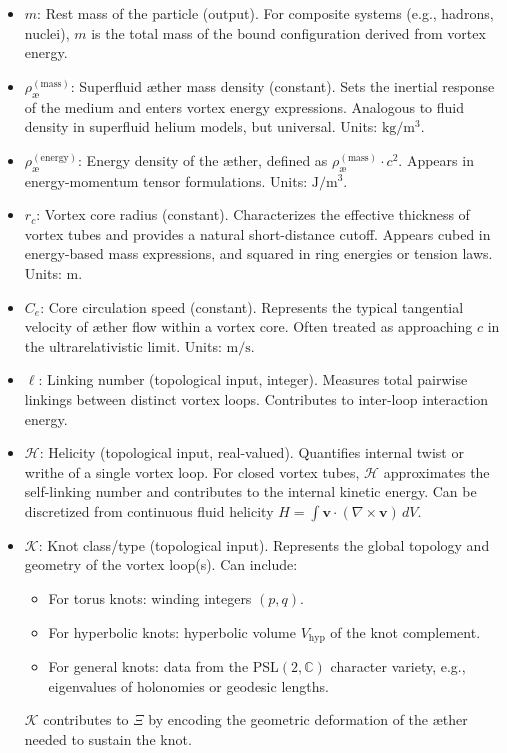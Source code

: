 \documentclass[11pt]{article}
\begin{document}
\begin{itemize}
    \item $m$: Rest mass of the particle (output). For composite systems (e.g., hadrons, nuclei), $m$ is the total mass of the bound configuration derived from vortex energy.

    \item $\rho_{\text{\ae}}^{(\mathrm{mass})}$: Superfluid æther mass density (constant). Sets the inertial response of the medium and enters vortex energy expressions. Analogous to fluid density in superfluid helium models, but universal. Units: $\mathrm{kg/m^3}$.

    \item $\rho_{\text{\ae}}^{(\mathrm{energy})}$: Energy density of the æther, defined as $\rho_{\text{\ae}}^{(\mathrm{mass})} \cdot c^2$. Appears in energy-momentum tensor formulations. Units: $\mathrm{J/m^3}$.

    \item $r_c$: Vortex core radius (constant). Characterizes the effective thickness of vortex tubes and provides a natural short-distance cutoff. Appears cubed in energy-based mass expressions, and squared in ring energies or tension laws. Units: $\mathrm{m}$.

    \item $C_e$: Core circulation speed (constant). Represents the typical tangential velocity of æther flow within a vortex core. Often treated as approaching $c$ in the ultrarelativistic limit. Units: $\mathrm{m/s}$.

    \item $\ell$: Linking number (topological input, integer). Measures total pairwise linkings between distinct vortex loops. Contributes to inter-loop interaction energy.

    \item $\mathcal{H}$: Helicity (topological input, real-valued). Quantifies internal twist or writhe of a single vortex loop. For closed vortex tubes, $\mathcal{H}$ approximates the self-linking number and contributes to the internal kinetic energy. Can be discretized from continuous fluid helicity $H = \int \mathbf{v} \cdot (\nabla \times \mathbf{v}) \, dV$.

    \item $\mathcal{K}$: Knot class/type (topological input). Represents the global topology and geometry of the vortex loop(s). Can include:
    \begin{itemize}
        \item For torus knots: winding integers $(p,q)$.
        \item For hyperbolic knots: hyperbolic volume $V_{\text{hyp}}$ of the knot complement.
        \item For general knots: data from the PSL$(2,\mathbb{C})$ character variety, e.g., eigenvalues of holonomies or geodesic lengths.
    \end{itemize}
    $\mathcal{K}$ contributes to $\Xi$ by encoding the geometric deformation of the æther needed to sustain the knot.
\end{itemize}
\end{document}
